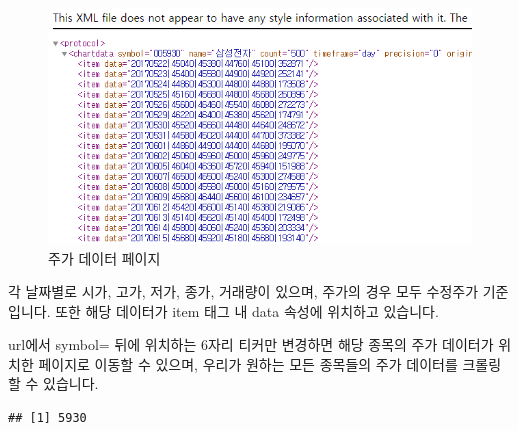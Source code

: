 \documentclass[12pt,]{book}
\newenvironment{Shaded}{\begin{snugshade}}{\end{snugshade}}
\newcommand{\DataTypeTok}[1]{\textcolor[rgb]{0.13,0.29,0.53}{#1}}
\newcommand{\DecValTok}[1]{\textcolor[rgb]{0.00,0.00,0.81}{#1}}
\newcommand{\KeywordTok}[1]{\textcolor[rgb]{0.13,0.29,0.53}{\textbf{#1}}}
\newcommand{\NormalTok}[1]{#1}
\newcommand{\OperatorTok}[1]{\textcolor[rgb]{0.81,0.36,0.00}{\textbf{#1}}}
\newcommand{\StringTok}[1]{\textcolor[rgb]{0.31,0.60,0.02}{#1}}
\begin{document}
\begin{figure}[h]

{\centering \includegraphics[width=0.7\linewidth]{images/crawl_practice_price3} 

}

\caption{주가 데이터 페이지}\label{fig:unnamed-chunk-3}
\end{figure}

각 날짜별로 시가, 고가, 저가, 종가, 거래량이 있으며, 주가의 경우 모두 수정주가 기준입니다. 또한 해당 데이터가 item 태그 내 data 속성에 위치하고 있습니다.

url에서 symbol= 뒤에 위치하는 6자리 티커만 변경하면 해당 종목의 주가 데이터가 위치한 페이지로 이동할 수 있으며, 우리가 원하는 모든 종목들의 주가 데이터를 크롤링 할 수 있습니다.

\begin{Shaded}
\end{Shaded}

\begin{verbatim}
## [1] 5930
\end{verbatim}

\begin{Shaded}
\end{Shaded}
\end{document}

